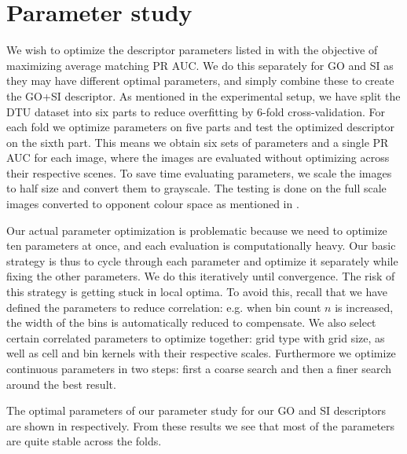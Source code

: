 \documentclass[thesis.tex]{subfiles}
\begin{document}
\section{Parameter study}
\label{sec:icParameterStudy}
%
%
%
%
We wish to optimize the descriptor parameters listed in  with the objective of maximizing average matching PR AUC. We do this separately for GO and SI as they may have different optimal parameters, and simply combine these to create the GO+SI descriptor. As mentioned in the experimental setup, we have split the DTU dataset into six parts to reduce overfitting by 6-fold cross-validation. For each fold we optimize parameters on five parts and test the optimized descriptor on the sixth part. This means we obtain six sets of parameters and a single PR AUC for each image, where the images are evaluated without optimizing across their respective scenes. To save time evaluating parameters, we scale the images to half size and convert them to grayscale. The testing is done on the full scale images converted to opponent colour space as mentioned in .

Our actual parameter optimization is problematic because we need to optimize ten parameters at once, and each evaluation is computationally heavy. Our basic strategy is thus to cycle through each parameter and optimize it separately while fixing the other parameters. We do this iteratively until convergence.
The risk of this strategy is getting stuck in local optima. To avoid this, recall that we have defined the parameters to reduce correlation: e.g. when bin count $n$ is increased, the width of the bins is automatically reduced to compensate. We also select certain correlated parameters to optimize together: grid type with grid size, as well as cell and bin kernels with their respective scales. Furthermore we optimize continuous parameters in two steps: first a coarse search and then a finer search around the best result.

The optimal parameters of our parameter study for our GO and SI descriptors are shown in  respectively.
From these results we see that most of the parameters are quite stable across the folds.
\end{document}
